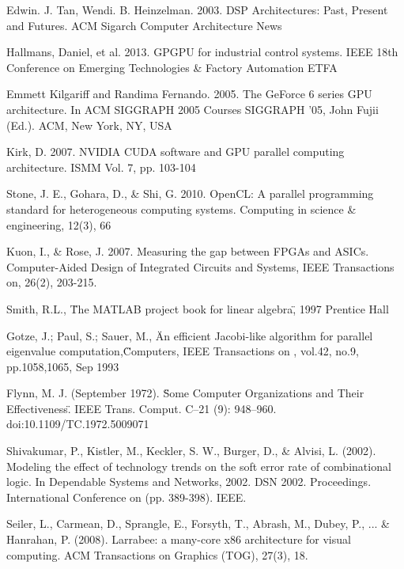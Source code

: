 \newpage
\pagestyle{plain}


\begin{thebibliography}{99}

 Edwin. J. Tan, Wendi. B. Heinzelman. 2003. DSP Architectures: Past, Present and Futures. ACM Sigarch Computer Architecture News

 Hallmans, Daniel, et al. 2013. GPGPU for industrial control systems. IEEE 18th Conference on Emerging Technologies \& Factory Automation ETFA

 Emmett Kilgariff and Randima Fernando. 2005. The GeForce 6 series GPU architecture. In ACM SIGGRAPH 2005 Courses SIGGRAPH '05, John Fujii (Ed.). ACM, New York, NY, USA

 Kirk, D. 2007. NVIDIA CUDA software and GPU parallel computing architecture. ISMM Vol. 7, pp. 103-104

 Stone, J. E., Gohara, D., \& Shi, G. 2010. OpenCL: A parallel programming standard for heterogeneous computing systems. Computing in science \& engineering, 12(3), 66

 Kuon, I., \& Rose, J. 2007. Measuring the gap between FPGAs and ASICs. Computer-Aided Design of Integrated Circuits and Systems, IEEE Transactions on, 26(2), 203-215.

Smith, R.L., \"The MATLAB project book for linear algebra\", 1997 Prentice Hall

 Gotze, J.; Paul, S.; Sauer, M., \"An efficient Jacobi-like algorithm for parallel eigenvalue computation,\" Computers, IEEE Transactions on , vol.42, no.9, pp.1058,1065, Sep 1993

Flynn, M. J. (September 1972). \"Some Computer Organizations and Their Effectiveness\". IEEE Trans. Comput. C–21 (9): 948–960. doi:10.1109/TC.1972.5009071

 Shivakumar, P., Kistler, M., Keckler, S. W., Burger, D., \& Alvisi, L. (2002). Modeling the effect of technology trends on the soft error rate of combinational logic. In Dependable Systems and Networks, 2002. DSN 2002. Proceedings. International Conference on (pp. 389-398). IEEE.

 Seiler, L., Carmean, D., Sprangle, E., Forsyth, T., Abrash, M., Dubey, P., ... \& Hanrahan, P. (2008). Larrabee: a many-core x86 architecture for visual computing. ACM Transactions on Graphics (TOG), 27(3), 18.


\end{thebibliography}
